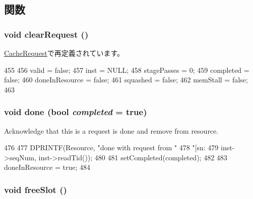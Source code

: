 \subsection{関数}
\hypertarget{classResourceRequest_ace5d1d4025bbb180364fdcb74e7a7c57}{
\subsubsection[{clearRequest}]{\setlength{\rightskip}{0pt plus 5cm}void clearRequest ()}}
\label{classResourceRequest_ace5d1d4025bbb180364fdcb74e7a7c57}


\hyperlink{classCacheRequest_ace5d1d4025bbb180364fdcb74e7a7c57}{CacheRequest}で再定義されています。


\begin{DoxyCode}
455 {
456     valid = false;
457     inst = NULL;
458     stagePasses = 0;
459     completed = false;
460     doneInResource = false;
461     squashed = false;
462     memStall = false;
463 }
\end{DoxyCode}
\hypertarget{classResourceRequest_a2a9dd8aec142709a08d9a73f37668427}{
\subsubsection[{done}]{\setlength{\rightskip}{0pt plus 5cm}void done (bool {\em completed} = {\ttfamily true})}}
\label{classResourceRequest_a2a9dd8aec142709a08d9a73f37668427}
Acknowledge that this is a request is done and remove from resource. 


\begin{DoxyCode}
476 {
477     DPRINTF(Resource, "done with request from "
478             "[sn:%
479             inst->seqNum, inst->readTid());
480 
481     setCompleted(completed);
482 
483     doneInResource = true;
484 }
\end{DoxyCode}
\hypertarget{classResourceRequest_a56a88e585d03dc018d319923f9f8ce70}{
\subsubsection[{freeSlot}]{\setlength{\rightskip}{0pt plus 5cm}void freeSlot ()}}
\label{classResourceRequest_a56a88e585d03dc018d319923f9f8ce70}



